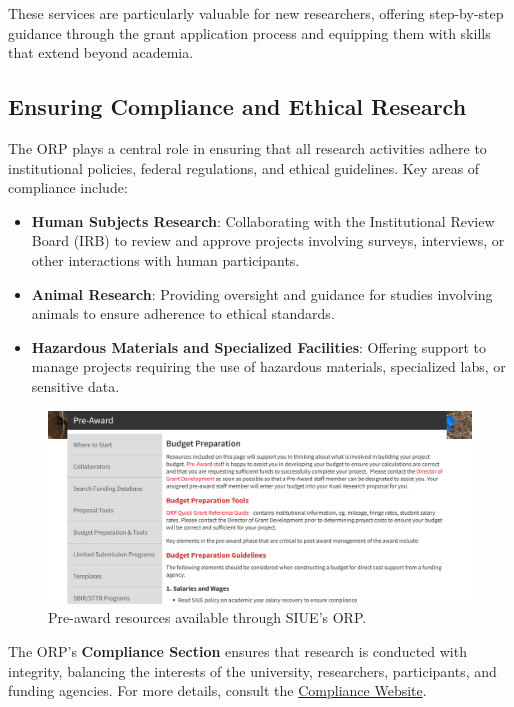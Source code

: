 \documentclass[
]{book}
\providecommand{\tightlist}{%
  \setlength{\itemsep}{0pt}\setlength{\parskip}{0pt}}
\begin{document}
These services are particularly valuable for new researchers, offering step-by-step guidance through the grant application process and equipping them with skills that extend beyond academia.

\subsection*{Ensuring Compliance and Ethical Research}\label{ensuring-compliance-and-ethical-research}

The ORP plays a central role in ensuring that all research activities adhere to institutional policies, federal regulations, and ethical guidelines. Key areas of compliance include:

\begin{itemize}
\tightlist
\item
  \textbf{Human Subjects Research}: Collaborating with the Institutional Review Board (IRB) to review and approve projects involving surveys, interviews, or other interactions with human participants.
\item
  \textbf{Animal Research}: Providing oversight and guidance for studies involving animals to ensure adherence to ethical standards.
\item
  \textbf{Hazardous Materials and Specialized Facilities}: Offering support to manage projects requiring the use of hazardous materials, specialized labs, or sensitive data.
\end{itemize}

\begin{figure}
\centering
\includegraphics[width=1\linewidth,height=\textheight,keepaspectratio]{images/orp-preaward.png}
\caption{Pre-award resources available through SIUE's ORP.}
\end{figure}

The ORP's \textbf{Compliance Section} ensures that research is conducted with integrity, balancing the interests of the university, researchers, participants, and funding agencies. For more details, consult the \href{https://www.siue.edu/compliance/}{Compliance Website}.
\end{document}
